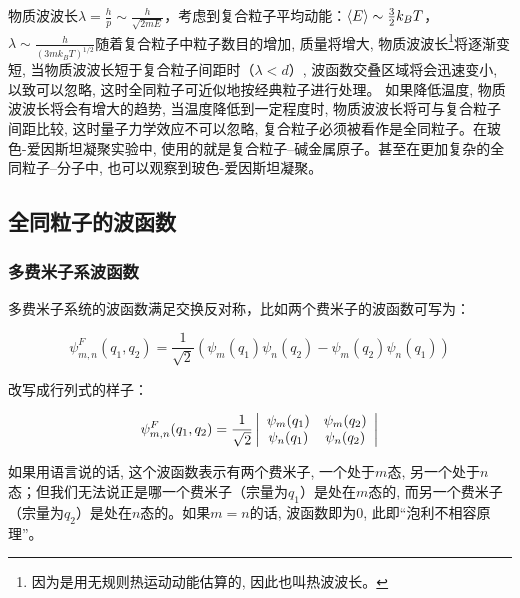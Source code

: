 物质波波长$\lambda  = \frac{h}{p} \sim \frac{h}{{\sqrt {2mE}
}}$，考虑到复合粒子平均动能：$\left\langle E \right\rangle  \sim
{\textstyle{3 \over 2}}k_B T$，$\lambda  \sim \frac{h}{{\left(
{3mk_B T} \right)^{1/2} }}$随着复合粒子中粒子数目的增加, 质量将增大,
物质波波长\footnote{因为是用无规则热运动动能估算的,
因此也叫热波波长。}将逐渐变短,
当物质波波长短于复合粒子间距时（$\lambda < d$）,
波函数交叠区域将会迅速变小, 以致可以忽略,
这时全同粒子可近似地按经典粒子进行处理。 如果降低温度,
物质波波长将会有增大的趋势, 当温度降低到一定程度时,
物质波波长将可与复合粒子间距比较, 这时量子力学效应不可以忽略,
复合粒子必须被看作是全同粒子。在玻色-爱因斯坦凝聚实验中,
使用的就是复合粒子--碱金属原子。甚至在更加复杂的全同粒子--分子中,
也可以观察到玻色-爱因斯坦凝聚。


\subsection{全同粒子的波函数}


\subsubsection{多费米子系波函数}

多费米子系统的波函数满足交换反对称，比如两个费米子的波函数可写为：

\begin{equation}\label{two-fermions}
   \psi_{m,n}^F (q_1,q_2) =\frac{1}{\sqrt{2}} (
\psi_m(q_1)\psi_n(q_2) - \psi_m(q_2) \psi_n(q_1) )
\end{equation}



改写成行列式的样子：


\begin{equation*}
 \psi _{m,n}^F (q_1 ,q_2 ) = \frac{1}{{\sqrt 2 }}\left|
{\begin{array}{*{20}c}
   {\psi _m (q_1 )} & {\psi _m (q_2 )}  \\
   {\psi _n (q_1 )} & {\psi _n (q_2 )}  \\
\end{array}} \right|
\end{equation*}


如果用语言说的话, 这个波函数表示有两个费米子, 一个处于$m$态,
另一个处于$n$态；但我们无法说正是哪一个费米子（宗量为$q_1$）是处在$m$态的,
而另一个费米子（宗量为$q_2$）是处在$n$态的。如果$m=n$的话,
波函数即为$0$, 此即``泡利不相容原理''。



